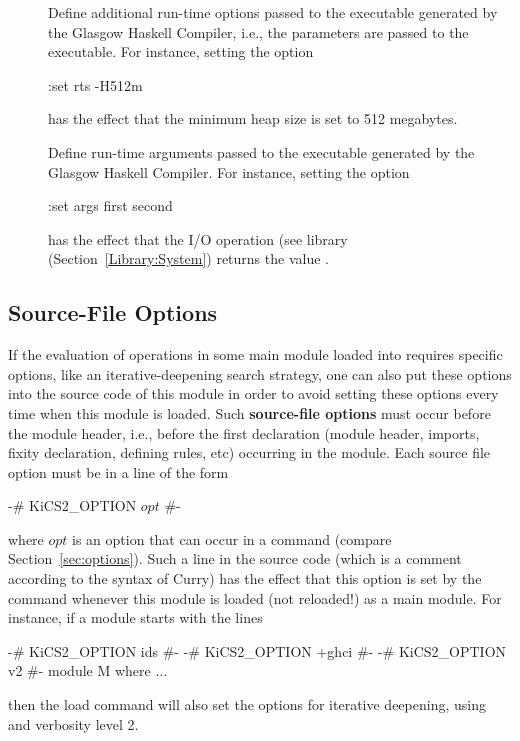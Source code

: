\begin{description}
\item[]
Define additional run-time options passed to the executable
generated by the Glasgow Haskell Compiler, i.e., the parameters
 are passed to the executable.
For instance, setting the option
\begin{curry}
:set rts -H512m
\end{curry}
has the effect that the minimum heap size is set to 512 megabytes.

\item[]
Define run-time arguments passed to the executable
generated by the Glasgow Haskell Compiler.
For instance, setting the option
\begin{curry}
:set args first second
\end{curry}
has the effect that the I/O operation 
(see library  (Section~\ref{Library:System})
returns the value .

\end{description}


\subsection{Source-File Options}

If the evaluation of operations in some main module loaded into
\CYS requires specific options, like an iterative-deepening
search strategy, one can also put these options into the source
code of this module in order to avoid setting these options
every time when this module is loaded.
Such
{\bf source-file options}
must occur before the module header, i.e., before the first declaration
(module header, imports, fixity declaration, defining rules, etc)
occurring in the module.
Each source file option must be in a line of the form
\begin{curry}
{-# KiCS2_OPTION $opt$ #-}
\end{curry}
where $opt$ is an option that can occur in a  command
(compare Section~\ref{sec:options}).
Such a line in the source code (which is a comment according to
the syntax of Curry)
has the effect that this option is set by the \CYS command
 whenever this module is loaded (not reloaded!)
as a main module. For instance, if a module starts with the
lines
\begin{curry}
{-# KiCS2_OPTION ids #-}
{-# KiCS2_OPTION +ghci #-}
{-# KiCS2_OPTION v2 #-}
module M where
$\ldots$
\end{curry}
then the load command  will also
set the options for iterative deepening, using 
and verbosity level 2.


